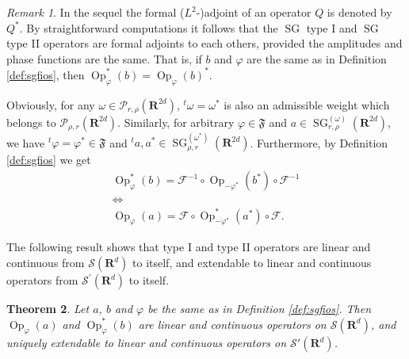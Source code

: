 \documentclass[12pt,a4paper,reqno]{amsart}
\numberwithin{equation}{section}
\newtheorem{thm}{Theorem}
\numberwithin{thm}{section}
\theoremstyle{definition}
\theoremstyle{remark}
\newtheorem{rem}[thm]{Remark}
\begin{document}
\begin{rem}\label{rem:sgsymm}
In the sequel the formal ($L^2$-)adjoint of an operator $Q$ is denoted by $Q^*$.
By straightforward computations it follows that the ${\operatorname{SG}}$ type I
and ${\operatorname{SG}}$ type II operators are formal adjoints to each others, provided the
amplitudes and phase functions are the same. That is, if $b$ and $\varphi$
are the same as in Definition \ref{def:sgfios}, then
${\operatorname{Op}}^*_\varphi(b)={\operatorname{Op}}_\varphi(b)^*$.

\par

Obviously, for any $\omega \in {\mathscr P}_{r,\rho}({\mathbf R^{{2d}}})$,
$^{t}\omega=\omega^*$ is also an admissible weight which belongs to
${\mathscr P}_{\rho,r}({\mathbf R^{{2d}}})$. Similarly, for arbitrary
$\varphi \in {\mathfrak{F}}$ and $a \in {\operatorname{SG}}^{(\omega)}_{r,\rho}({\mathbf R^{{2d}}})$, we have
$^{t}\varphi=\varphi ^*\in{\mathfrak{F}}$ and $^{t}a, a^*\in{\operatorname{SG}} ^{(\omega ^*)} _{\rho,r}({\mathbf R^{{2d}}})$.
Furthermore, by Definition \ref{def:sgfios} we get
\begin{equation}\label{eq:typeI-II}
\begin{gathered}
{\operatorname{Op}}_\varphi^*(b) =  {{\mathscr F}}^{-1} \circ {\operatorname{Op}}_{- \varphi ^*}(b^*) \circ {{\mathscr F}}^{-1}
\\[1ex]
\Longleftrightarrow
\\[1ex]
{\operatorname{Op}}_{\varphi}(a) =  {{\mathscr F}} \circ {\operatorname{Op}} _{- \varphi ^*}^*(a^*) \circ {{\mathscr F}}.
\end{gathered}
\end{equation}
\end{rem}

\par

The following result shows that type I and type II operators
are linear and continuous from ${{\mathscr S}} ({\mathbf R^{d}})$ to itself, and
extendable to linear and continuous operators from
${{\mathscr S}}^\prime({\mathbf R^{d}})$ to itself.

\par

\begin{thm}
\label{thm:2.1}
Let $a$, $b$ and $\varphi$ be the same as in Definition \ref{def:sgfios}.
Then ${\operatorname{Op}} _{\varphi} (a)$ and ${\operatorname{Op}} _{\varphi} ^*(b)$ are linear and continuous
operators on ${{\mathscr S}} ({\mathbf R^{d}})$, and uniquely extendable to linear and
continuous operators on ${{\mathscr S}} '({\mathbf R^{d}})$.
\end{thm}
\end{document}
